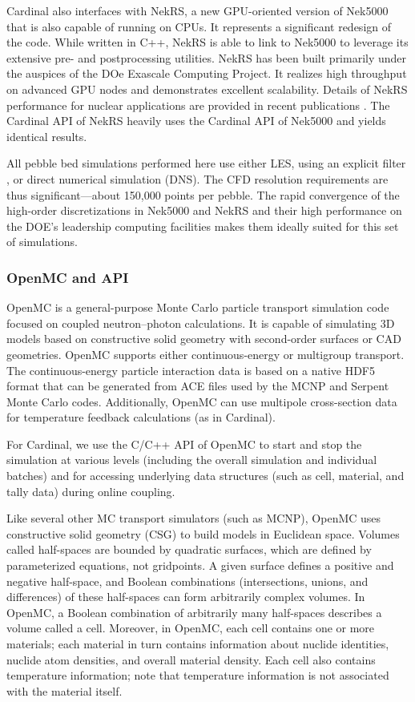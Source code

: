 Cardinal also interfaces with NekRS, a new GPU-oriented version of Nek5000
that is also capable of running on CPUs. It represents a significant redesign
of the code.  While written in C++, NekRS is able to link to Nek5000 to
leverage its extensive pre- and postprocessing utilities.  NekRS has been
built primarily under the auspices of the DOe Exascale Computing Project. It
realizes high throughput on advanced GPU nodes and demonstrates excellent
scalability.  Details of NekRS performance for nuclear applications are
provided in recent publications \cite{merzari2020toward}. The Cardinal API of
NekRS heavily uses the Cardinal API of Nek5000 and yields identical results.

  All pebble bed simulations performed here use either LES, using an explicit
filter \cite{fischer2001filter}, or direct numerical simulation (DNS). The CFD
resolution requirements are thus significant---about 150,000 points per pebble.
The rapid convergence of the high-order discretizations in Nek5000 and NekRS
and their high performance on the DOE's leadership computing facilities makes
them ideally suited for this set of simulations.

\subsubsection{OpenMC and API}

OpenMC \cite{romano2015openmc} is a general-purpose Monte Carlo particle transport simulation code focused on coupled neutron--photon calculations. It is
capable of simulating 3D models based on constructive solid geometry with second-order surfaces or CAD geometries. OpenMC
supports either continuous-energy or multigroup transport. The continuous-energy particle interaction data
is based on a native HDF5 format that can be generated from ACE files used by the MCNP and Serpent
Monte Carlo codes. Additionally, OpenMC can use multipole cross-section data for temperature feedback
calculations (as in Cardinal).

For Cardinal, we use the C/C++ API of OpenMC to start and stop the simulation at various levels (including the overall
simulation and individual batches) and for accessing underlying data structures (such as cell, material, and
tally data) during online coupling.

Like several other MC transport simulators (such as MCNP), OpenMC uses constructive solid geometry (CSG) to build models in Euclidean space.
Volumes called half-spaces are bounded by quadratic surfaces, which are defined by parameterized equations, not gridpoints. A given surface defines a positive and negative half-space, and Boolean combinations (intersections, unions, and differences) of these half-spaces can form arbitrarily complex volumes. In OpenMC, a Boolean combination of arbitrarily many half-spaces describes a volume called a cell. Moreover, in OpenMC, each cell contains one or more materials; each material in turn contains information about nuclide identities, nuclide atom densities, and overall material density. Each cell also contains temperature information; note that temperature information is not associated with the material itself.

